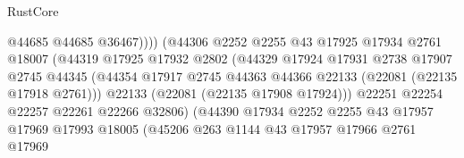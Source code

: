 \begin{lexlean}{RustCore}
\begin{coremodule}
                                            @44685
                                            @44685
                                            @36467))))
                                    (@44306
                                      @2252
                                      @2255
                                      @43
                                      @17925
                                      @17934
                                      @2761
                                      @18007
                                      (@44319
                                        @17925
                                        @17932
                                        @2802
                                        (@44329
                                          @17924
                                          @17931
                                          @2738
                                          @17907
                                          @2745
                                          @44345
                                          (@44354
                                            @17917
                                            @2745
                                            @44363
                                            @44366
                                            @22133
                                            (@22081 (@22135 @17918 @2761)))
                                          @22133
                                          (@22081 (@22135 @17908 @17924)))
                                        @22251
                                        @22254
                                        @22257
                                        @22261
                                        @22266
                                        @32806)
                                      (@44390
                                        @17934
                                        @2252
                                        @2255
                                        @43
                                        @17957
                                        @17969
                                        @17993
                                        @18005
                                        (@45206
                                          @263
                                          @1144
                                          @43
                                          @17957
                                          @17966
                                          @2761
                                          @17969

\end{coremodule}
\end{lexlean}
